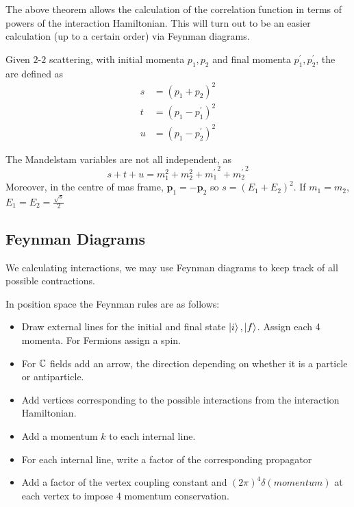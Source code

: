 \documentclass{article}
\begin{document}
\begin{idea}
The above theorem allows the calculation of the correlation function in terms of powers of the interaction Hamiltonian. This will turn out to be an easier calculation (up to a certain order) via Feynman diagrams. 
\end{idea}

\begin{definition}
Given $2$-$2$ scattering, with initial momenta $p_1,p_2$ and final momenta $p_1^\prime, p_2^\prime$, the  are defined as 
\begin{align*}
    s &= (p_1 + p_2)^2 \\ 
    t &= (p_1 - p_1^\prime)^2 \\
    u &= (p_1 - p_2^\prime)^2 
\end{align*}
\end{definition}

\begin{theorem}
The Mandelstam variables are not all independent, as 
\[
s+t+u = m_1^2 + m_2^2 + {m_1^\prime}^2 +{m_2^\prime}^2
\]
Moreover, in the centre of mas frame, $\bm{p}_1 = -\bm{p}_2$ so $s=(E_1+E_2)^2$. If $m_1 = m_2$, $E_1=E_2 = \frac{\sqrt{s}}{2}$
\end{theorem}

\subsection{Feynman Diagrams}

We calculating interactions, we may use Feynman diagrams to keep track of all possible contractions. 

\begin{theorem}
In position space the Feynman rules are as follows: 
\begin{itemize}
    \item Draw external lines for the initial and final state $\ket{i}, \ket{f}$. Assign each 4 momenta. For Fermions assign a spin. 
    \item For $\mathbb{C}$ fields add an arrow, the direction depending on whether it is a particle or antiparticle. 
    \item Add vertices corresponding to the possible interactions from the interaction Hamiltonian. 
    \item Add a momentum $k$ to each internal line. 
    \item For each internal line, write a factor of the corresponding propagator
    \item Add a factor of the vertex coupling constant and $(2\pi)^4 \delta(momentum)$ at each vertex to impose 4 momentum conservation. 
\end{itemize}
\end{theorem}
\end{document}
